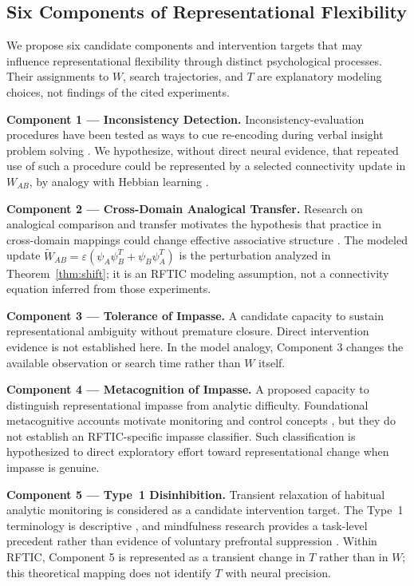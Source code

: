 \documentclass[a4paper,twocolumn,10pt]{article}
\newcommand{\eps}{\varepsilon}
\newcommand{\psiA}{\psi_A}
\newcommand{\psiB}{\psi_B}
\newcommand{\WAB}{\tilde{W}_{AB}}
\begin{document}
\subsection{Six Components of Representational Flexibility}

We propose six candidate components and intervention targets that may influence representational
flexibility through distinct psychological processes. Their assignments to $W$, search trajectories,
and $T$ are explanatory modeling choices, not findings of the cited experiments.

\textbf{Component 1 --- Inconsistency Detection.}
Inconsistency-evaluation procedures have been tested as ways to cue re-encoding during verbal insight
problem solving \citep{patrick2014training,patrick2015representation}. We hypothesize, without
direct neural evidence, that repeated use of such a procedure could be represented by a selected
connectivity update in $W_{AB}$, by analogy with Hebbian learning
\citep{hebb1949organization}.

\textbf{Component 2 --- Cross-Domain Analogical Transfer.}
Research on analogical comparison and transfer motivates the hypothesis that practice in cross-domain
mappings could change effective associative structure \citep{gick1983analogy,kurtz2007analogy}.
The modeled update $\WAB = \eps(\psiA\psiB^T + \psiB\psiA^T)$ is the perturbation analyzed in
Theorem~\ref{thm:shift}; it is an RFTIC modeling assumption, not a connectivity equation inferred
from those experiments.

\textbf{Component 3 --- Tolerance of Impasse.}
A candidate capacity to sustain representational ambiguity without premature closure. Direct
intervention evidence is not established here. In the model analogy, Component 3 changes the
available observation or search time rather than $W$ itself.

\textbf{Component 4 --- Metacognition of Impasse.}
A proposed capacity to distinguish representational impasse from analytic difficulty. Foundational
metacognitive accounts motivate monitoring and control concepts
\citep{flavell1979metacognition,nelson1990metamemory}, but they do not establish an
RFTIC-specific impasse classifier. Such classification is hypothesized to direct exploratory effort
toward representational change when impasse is genuine.

\textbf{Component 5 --- Type~1 Disinhibition.}
Transient relaxation of habitual analytic monitoring is considered as a candidate intervention
target. The Type~1 terminology is descriptive \citep{kahneman2011thinking}, and mindfulness
research provides a task-level precedent rather than evidence of voluntary prefrontal suppression
\citep{ostafin2012mindfulness}. Within RFTIC, Component 5 is represented as a transient change in
$T$ rather than in $W$; this theoretical mapping does not identify $T$ with neural precision.
\end{document}
